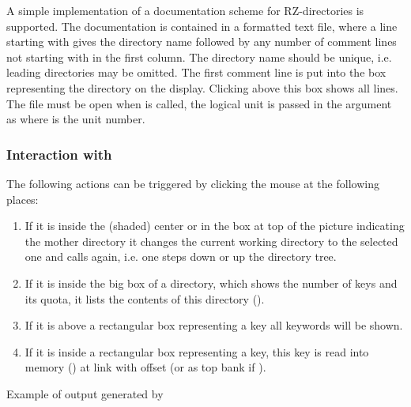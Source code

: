 A simple implementation of a documentation scheme for RZ-directories is
supported. 
The documentation is contained in a formatted text file,
where a line starting with  gives the directory name followed by
any number of comment lines not starting with  in the first column. 
The  directory name should be unique, i.e. leading directories may be 
omitted. 
The first  comment line is put into the box representing the
directory on the display. 
Clicking above this box shows all lines.
The file must be open when  is called, the logical unit is passed
in the  argument as  where  is the unit number. 
 
 
\subsubsection*{Interaction with }
 
The following actions can be triggered by clicking the mouse at the
following places:
 
\begin{enumerate}
\item If it is inside the (shaded) center or in the
      box at top of the picture indicating the mother directory
      it changes the current working directory to the selected one
      and calls  again, i.e. one steps down or up the directory tree.
\item If it is inside the big box of a directory, which shows the number of
      keys and its quota, it lists the contents of this directory ().
\item If it is above a rectangular box representing a key all keywords will be shown.
\item If it is inside a rectangular
      box representing a key, this key is read into memory () at link
       with offset  (or as top bank if ).
\end{enumerate}
 
\finalnewpage
 
\begin{Fighere}
\begin{center}
\end{center} 
\caption[Example of output generated by {\tt DZDIRZ}]{Example of output generated by }
\end{Fighere}
 
 

